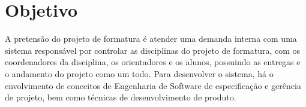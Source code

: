 \chapter{Objetivo}

A pretensão do projeto de formatura é atender uma demanda interna com uma sistema responsável por controlar as disciplinas do projeto de formatura, com os coordenadores da disciplina, os orientadores e os alunos, possuindo as entregas e o andamento do projeto como um todo. Para desenvolver o sistema, há o envolvimento de conceitos de Engenharia de Software de especificação e gerência de projeto, bem como técnicas de desenvolvimento de produto.

\begin{citacaoLonga}
  \blindtext
\end{citacaoLonga}

\blindtext
